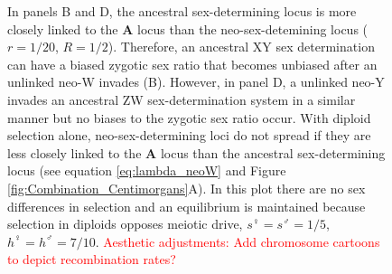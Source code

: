 \documentclass[12pt]{article}
\begin{document}
\begin{figure}[!h]
{In panels B and D, the ancestral sex-determining locus is more closely linked to the \textbf{A} locus than the neo-sex-detemining locus ($r=1/20$, $R=1/2$). 
Therefore, an ancestral XY sex determination can have a biased zygotic sex ratio that becomes unbiased after an unlinked neo-W invades (B). 
However, in panel D, a unlinked neo-Y invades an ancestral ZW sex-determination system in a similar manner but no biases to the zygotic sex ratio occur. 
With diploid selection alone, neo-sex-determining loci do not spread if they are less closely linked to the \textbf{A} locus than the ancestral sex-determining locus (see equation \eqref{eq:lambda_neoW} and Figure \ref{fig:Combination_Centimorgans}A). 
In this plot there are no sex differences in selection and an equilibrium is maintained because selection in diploids opposes meiotic drive, $s^\female =s^\male = 1/5$, $h^\female = h^\male = 7/10$.
\textcolor{red}{Aesthetic adjustments: 
Add chromosome cartoons to depict recombination rates?
}
}
\label{fig:Combination_Turnover}
\end{figure}
\newpage
\end{document}
